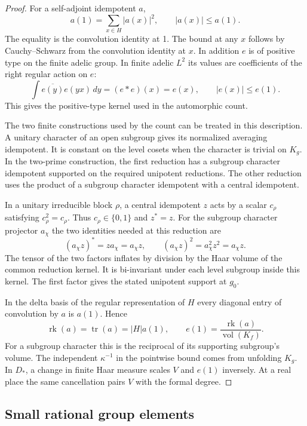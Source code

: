 \begin{proof}
For a self-adjoint
idempotent \(a\),
\[
  a(1)=\sum_{x\in H}|a(x)|^2,\qquad |a(x)|\le a(1).
\]
The equality is the convolution identity at 1. The bound at any
\(x\) follows by Cauchy--Schwarz from the convolution identity at
\(x\). In addition \(e\) is of positive type on the finite adelic
group. In finite adelic \(L^2\) its values are coefficients of the right
regular action on \(e\):
\[
 \int\overline{e(y)}e(yx)\,dy=(e*e)(x)=e(x),\qquad |e(x)|\le e(1).
\]
This gives the positive-type kernel used in the automorphic count.

The two finite constructions used by the count can be treated in
this description. A unitary character of an open subgroup gives
its normalized averaging idempotent. It is constant on the level
cosets when the character is trivial on \(K_g\). In the two-prime
construction, the first reduction has a subgroup character
idempotent supported on the required unipotent reductions. The
other reduction uses the product of a subgroup character
idempotent with a central idempotent.

In a unitary irreducible block \(\rho\), a central idempotent
\(z\) acts by a scalar \(c_\rho\) satisfying \(c_\rho^2=c_\rho\).
Thus \(c_\rho\in\{0,1\}\) and \(z^*=z\). For the subgroup
character projector \(a_\chi\) the two identities needed at this
reduction are
\[
 (a_\chi z)^*=z a_\chi=a_\chi z,\qquad
 (a_\chi z)^2=a_\chi^2 z^2=a_\chi z .
\]
The tensor of the two factors inflates by division by the Haar
volume of the common reduction kernel. It is bi-invariant under
each level subgroup inside this kernel. The first factor gives
the stated unipotent support at \(g_0\).

In the delta basis of the regular representation of \(H\) every
diagonal entry of convolution by \(a\) is \(a(1)\). Hence
\[
 \operatorname{rk}(a)=\operatorname{tr}(a)=|H|a(1),\qquad
 e(1)=\frac{\operatorname{rk}(a)}{\operatorname{vol}(K_f)} .
\]
For a subgroup character this is the reciprocal of its supporting
subgroup's volume. The independent \(\kappa^{-1}\) in the pointwise
bound comes from unfolding \(K_g\). In \(D_*\), a change in finite
Haar measure scales \(V\) and \(e(1)\) inversely. At a real place
the same cancellation pairs \(V\) with the formal degree.

\end{proof}




\subsection{Small rational group elements}

